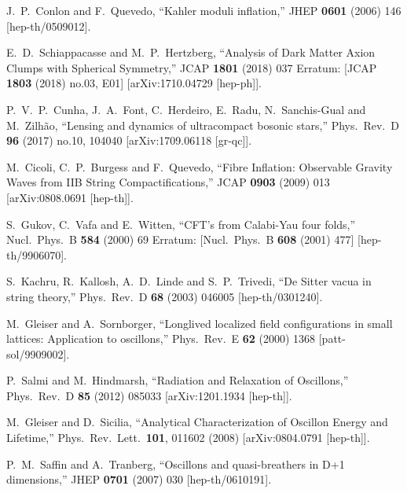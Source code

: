 \documentclass[11pt,a4paper]{article}
\begin{document}
\begin{thebibliography}{99}
  J.~P.~Conlon and F.~Quevedo,
  ``Kahler moduli inflation,''
  JHEP {\bf 0601} (2006) 146
  [hep-th/0509012].
  
  E.~D.~Schiappacasse and M.~P.~Hertzberg,
  ``Analysis of Dark Matter Axion Clumps with Spherical Symmetry,''
  JCAP {\bf 1801} (2018) 037
   Erratum: [JCAP {\bf 1803} (2018) no.03,  E01]
  [arXiv:1710.04729 [hep-ph]].
  
  P.~V.~P.~Cunha, J.~A.~Font, C.~Herdeiro, E.~Radu, N.~Sanchis-Gual and M.~Zilhão,
  ``Lensing and dynamics of ultracompact bosonic stars,''
  Phys.\ Rev.\ D {\bf 96} (2017) no.10,  104040
  [arXiv:1709.06118 [gr-qc]].
  
  M.~Cicoli, C.~P.~Burgess and F.~Quevedo,
  ``Fibre Inflation: Observable Gravity Waves from IIB String Compactifications,''
  JCAP {\bf 0903} (2009) 013
  [arXiv:0808.0691 [hep-th]].
  
  S.~Gukov, C.~Vafa and E.~Witten,
  ``CFT's from Calabi-Yau four folds,''
  Nucl.\ Phys.\ B {\bf 584} (2000) 69
   Erratum: [Nucl.\ Phys.\ B {\bf 608} (2001) 477]
  [hep-th/9906070].
  
  S.~Kachru, R.~Kallosh, A.~D.~Linde and S.~P.~Trivedi,
  ``De Sitter vacua in string theory,''
  Phys.\ Rev.\ D {\bf 68} (2003) 046005
  [hep-th/0301240].
  
  M.~Gleiser and A.~Sornborger,
  ``Longlived localized field configurations in small lattices: Application to oscillons,''
  Phys.\ Rev.\ E {\bf 62} (2000) 1368
  [patt-sol/9909002].  
  
  P.~Salmi and M.~Hindmarsh,
  ``Radiation and Relaxation of Oscillons,''
  Phys.\ Rev.\ D {\bf 85} (2012) 085033
  [arXiv:1201.1934 [hep-th]].
  
  M.~Gleiser and D.~Sicilia,
  ``Analytical Characterization of Oscillon Energy and Lifetime,''
  Phys.\ Rev.\ Lett.\  {\bf 101}, 011602 (2008)
  [arXiv:0804.0791 [hep-th]].
  
  P.~M.~Saffin and A.~Tranberg,
  ``Oscillons and quasi-breathers in D+1 dimensions,''
  JHEP {\bf 0701} (2007) 030
  [hep-th/0610191].
  

\end{thebibliography}
\end{document}
